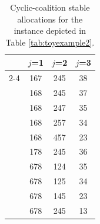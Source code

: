 \documentclass[preprint,11pt,authoryear]{elsarticle}
\newcommand\cd[1]{{\color{violet}#1}}
\begin{document}
\begin{table}%
    \centering
    \begin{tabular}{c|ccc}
    \toprule    
     & $j$=1 & $j$=2 & $j$=3 \\ \cmidrule(lr){2-4}
    \multirow{10}{.8cm}{$i$} & 167 &  245 & 38  \\ 
      & 168 &  245 & 37 \\ 
      & 168 &  247 & 35  \\ 
      & 168 &  257 & 34 \\ 
      & 168 &  457 & 23 \\ 
      & 178 &  245 & 36  \\ 
      & 678 &  124 & 35 \\ 
      & 678 &  125 & 34  \\ 
      & 678 &  145 & 23 \\ 
      & 678 &  245 & 13 \\ 
    \bottomrule
\end{tabular}
\caption{Cyclic-coalition stable allocations for the instance depicted in Table \ref{tab:toyexample2}.} 
\label{tab:toyexample2solution}
\end{table}



\end{document}
